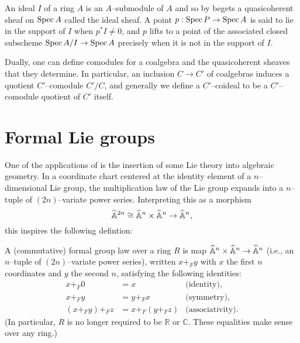 \begin{example}
An ideal $I$ of a ring $A$ is an $A$--submodule of $A$ and so by  begets a quasicoherent sheaf on $\operatorname{Spec} A$ called the ideal sheaf.  A point $p: \operatorname{Spec} P \to \operatorname{Spec} A$ is said to lie in the support of $I$ when $p^* I \ne 0$, and $p$ lifts to a point of the associated closed subscheme $\operatorname{Spec} A/I \to \operatorname{Spec} A$ precisely when it is not in the support of $I$.
\end{example}

\begin{example}\label{DefnCoideal}
Dually, one can define comodules for a coalgebra and the quasicoherent sheaves that they determine.  In particular, an inclusion $C \to C'$ of coalgebras induces a quotient $C'$--comodule $C' / C$, and generally we define a $C'$--coideal to be a $C'$--comodule quotient of $C'$ itself.
\end{example}





\section{Formal Lie groups}\label{FormalLieGroups}

One of the applications of  is the insertion of some Lie theory into algebraic geometry.  In a coordinate chart centered at the identity element of a $n$--dimensional Lie group, the multiplication law of the Lie group expands into a $n$--tuple of $(2n)$--variate power series.  Interpreting this as a morphism \[\widehat{\mathbb{A}}^{2n} \cong \widehat{\mathbb{A}}^n \times \widehat{\mathbb{A}}^n \to \widehat{\mathbb{A}}^n,\] this inspires the following defintion:
\begin{definition}\label{DefinitionOfDimension}
A (commutative) formal group law over a ring $R$ is map $\widehat{\mathbb{A}}^n \times \widehat{\mathbb{A}}^n \to \widehat{\mathbb{A}}^n$ (i.e., an $n$--tuple of $(2n)$--variate power series), written $x +_F y$ with $x$ the first $n$ coordinates and $y$ the second $n$, satisfying the following identities:
\begin{align*}
x +_F 0 & = x & \text{(identity)}, \\
x +_F y & = y +_F x & \text{(symmetry)}, \\
(x +_F y) +_F z & = x +_F (y +_F z) & \text{(associativity)}.
\end{align*}
(In particular, $R$ is no longer required to be $\mathbb{R}$ or $\mathbb C$. These equalities make sense over any ring.)
\end{definition}

